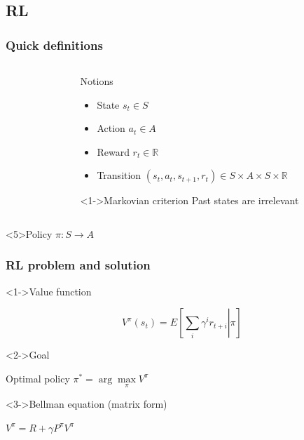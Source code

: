 \documentclass{beamer}
\begin{document}
\subsection{RL}
\label{sec-2_1}
\begin{frame}
\frametitle{Quick definitions}
\label{sec-2_1_1}

       \begin{columns}
    \begin{column}{4cm}
      \begin{block}{}
        \begin{overlayarea}{\textwidth}{4.4cm}
          \only<1>{}
          \only<2>{}
          \only<3>{}
        \end{overlayarea}
      \end{block}
    \end{column}
    \begin{column}{4cm}
      \begin{block}{Notions}
        \begin{itemize}
          \item<1-> State $s_t\in S$
          \item<2-> Action $a_t \in A$
          \item<3-> Reward $r_t \in \mathbb{R}$
          \item<4-> Transition $(s_t,a_t,s_{t+1},r_t)\in S\times A\times S\times\mathbb{R}$
        \end{itemize}
      \end{block}
      \begin{block}<1->{Markovian criterion}
        Past states are irrelevant
      \end{block}
    \end{column}
  \end{columns}
  \begin{alertblock}<5>{Policy}
    $\pi: S\rightarrow A$
  \end{alertblock}
\end{frame}
\begin{frame}
\frametitle{RL problem and solution}
\label{sec-2_1_2}
\begin{block}<1->{Value function}
\label{sec-2_1_2_1}

     \begin{equation}
     \label{eqn:V}
     V^\pi(s_t) = E\left[\left.\sum\limits_{i}\gamma^i r_{t+i}\right|\pi\right]
     \end{equation}
\end{block}
\begin{block}<2->{Goal}
\label{sec-2_1_2_2}

     Optimal policy $\pi^* = \arg\max\limits_\pi V^\pi$
\end{block}
\begin{block}<3->{Bellman equation (matrix form)}
\label{sec-2_1_2_3}

     $V^\pi = R + \gamma P^\pi V^\pi$
\end{block}
\end{frame}
\end{document}
